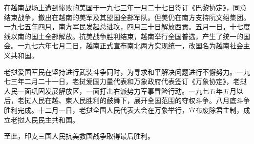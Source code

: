 \begin{maonote}
在越南战场上遭到惨败的美国于一九七三年一月二十七日签订《巴黎协定》，同意结束战争，撤出在越南的美军及其盟国全部军队。但美仍在南方支持阮文绍集团。一九七五年四月，南方军民发起总进攻，四月三十日解放西贡。五月一日，十七度线以南的国土全部解放。抗美战争胜利结束，越南举行全国普选，产生了统一的国会。一九七六年七月二日，越南正式宣布南北两方实现统一，改国名为越南社会主义共和国。

老挝爱国军民在坚持进行武装斗争同时，为寻求和平解决问题进行不懈努力。一九七三年二月二十一日，老挝爱国力量代表和万象政府代表签订《万象协定》，老挝人民一面巩固发展解放区，一面打击右派势力军事冒险行动。一九七五年五月以后，老挝人民在越、柬人民胜利的鼓舞下，展开全国范围的夺权斗争。八月底斗争胜利完成。十二月一日，老挝全国人民代表大会在万象举行，宣布废除君主制，成立老挝人民民主共和国。

至此，印支三国人民抗美救国战争取得最后胜利。
\end{maonote}
